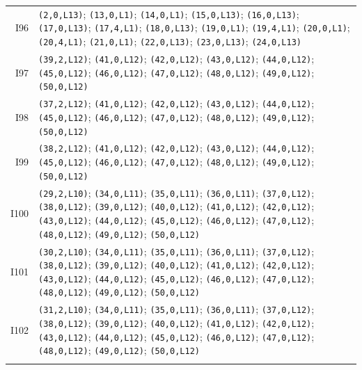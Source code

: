 {\begin{longtable}{@{}r p{14.7cm}@{}}
I96 & \texttt{(2,0,L13)}; \texttt{(13,0,L1)}; \texttt{(14,0,L1)}; \texttt{(15,0,L13)}; \texttt{(16,0,L13)}; \texttt{(17,0,L13)}; \texttt{(17,4,L1)}; \texttt{(18,0,L13)}; \texttt{(19,0,L1)}; \texttt{(19,4,L1)}; \texttt{(20,0,L1)}; \texttt{(20,4,L1)}; \texttt{(21,0,L1)}; \texttt{(22,0,L13)}; \texttt{(23,0,L13)}; \texttt{(24,0,L13)}\\\addlinespace[3pt]
I97 & \texttt{(39,2,L12)}; \texttt{(41,0,L12)}; \texttt{(42,0,L12)}; \texttt{(43,0,L12)}; \texttt{(44,0,L12)}; \texttt{(45,0,L12)}; \texttt{(46,0,L12)}; \texttt{(47,0,L12)}; \texttt{(48,0,L12)}; \texttt{(49,0,L12)}; \texttt{(50,0,L12)}\\\addlinespace[3pt]
I98 & \texttt{(37,2,L12)}; \texttt{(41,0,L12)}; \texttt{(42,0,L12)}; \texttt{(43,0,L12)}; \texttt{(44,0,L12)}; \texttt{(45,0,L12)}; \texttt{(46,0,L12)}; \texttt{(47,0,L12)}; \texttt{(48,0,L12)}; \texttt{(49,0,L12)}; \texttt{(50,0,L12)}\\\addlinespace[3pt]
I99 & \texttt{(38,2,L12)}; \texttt{(41,0,L12)}; \texttt{(42,0,L12)}; \texttt{(43,0,L12)}; \texttt{(44,0,L12)}; \texttt{(45,0,L12)}; \texttt{(46,0,L12)}; \texttt{(47,0,L12)}; \texttt{(48,0,L12)}; \texttt{(49,0,L12)}; \texttt{(50,0,L12)}\\\addlinespace[3pt]
I100 & \texttt{(29,2,L10)}; \texttt{(34,0,L11)}; \texttt{(35,0,L11)}; \texttt{(36,0,L11)}; \texttt{(37,0,L12)}; \texttt{(38,0,L12)}; \texttt{(39,0,L12)}; \texttt{(40,0,L12)}; \texttt{(41,0,L12)}; \texttt{(42,0,L12)}; \texttt{(43,0,L12)}; \texttt{(44,0,L12)}; \texttt{(45,0,L12)}; \texttt{(46,0,L12)}; \texttt{(47,0,L12)}; \texttt{(48,0,L12)}; \texttt{(49,0,L12)}; \texttt{(50,0,L12)}\\\addlinespace[3pt]
I101 & \texttt{(30,2,L10)}; \texttt{(34,0,L11)}; \texttt{(35,0,L11)}; \texttt{(36,0,L11)}; \texttt{(37,0,L12)}; \texttt{(38,0,L12)}; \texttt{(39,0,L12)}; \texttt{(40,0,L12)}; \texttt{(41,0,L12)}; \texttt{(42,0,L12)}; \texttt{(43,0,L12)}; \texttt{(44,0,L12)}; \texttt{(45,0,L12)}; \texttt{(46,0,L12)}; \texttt{(47,0,L12)}; \texttt{(48,0,L12)}; \texttt{(49,0,L12)}; \texttt{(50,0,L12)}\\\addlinespace[3pt]
I102 & \texttt{(31,2,L10)}; \texttt{(34,0,L11)}; \texttt{(35,0,L11)}; \texttt{(36,0,L11)}; \texttt{(37,0,L12)}; \texttt{(38,0,L12)}; \texttt{(39,0,L12)}; \texttt{(40,0,L12)}; \texttt{(41,0,L12)}; \texttt{(42,0,L12)}; \texttt{(43,0,L12)}; \texttt{(44,0,L12)}; \texttt{(45,0,L12)}; \texttt{(46,0,L12)}; \texttt{(47,0,L12)}; \texttt{(48,0,L12)}; \texttt{(49,0,L12)}; \texttt{(50,0,L12)}\\\addlinespace[3pt]

\end{longtable}}
